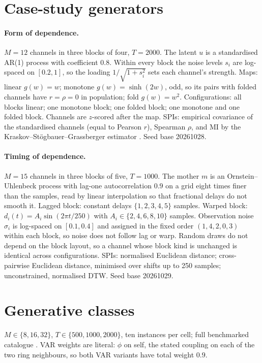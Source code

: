 \section{Case-study generators}
\label{app:cases}

\paragraph{Form of dependence.} $M=12$ channels in three blocks of four, $T=2000$. The latent $u$ is a standardised AR(1) process with coefficient $0.8$. Within every block the noise levels $s_i$ are log-spaced on $[0.2, 1]$, so the loading $1/\sqrt{1+s_i^2}$ sets each channel's strength. Maps: linear $g(w)=w$; monotone $g(w)=\sinh(2w)$, odd, so its pairs with folded channels have $r=\rho=0$ in population; fold $g(w)=w^2$. Configurations: all blocks linear; one monotone block; one folded block; one monotone and one folded block. Channels are $z$-scored after the map. SPIs: empirical covariance of the standardised channels (equal to Pearson $r$), Spearman $\rho$, and MI by the Kraskov--St\"ogbauer--Grassberger estimator . Seed base 20261028.

\paragraph{Timing of dependence.} $M=15$ channels in three blocks of five, $T=1000$. The mother $m$ is an Ornstein--Uhlenbeck process with lag-one autocorrelation $0.9$ on a grid eight times finer than the samples, read by linear interpolation so that fractional delays do not smooth it. Lagged block: constant delays $\{1,2,3,4,5\}$ samples. Warped block: $d_i(t) = A_i \sin(2\pi t/250)$ with $A_i \in \{2,4,6,8,10\}$ samples. Observation noise $\sigma_i$ is log-spaced on $[0.1, 0.4]$ and assigned in the fixed order $(1,4,2,0,3)$ within each block, so noise does not follow lag or warp. Random draws do not depend on the block layout, so a channel whose block kind is unchanged is identical across configurations. SPIs: normalised Euclidean distance; cross-pairwise Euclidean distance, minimised over shifts up to 250 samples; unconstrained, normalised DTW. Seed base 20261029.

\section{Generative classes}
\label{app:proof}
$M \in \{8,16,32\}$, $T \in \{500,1000,2000\}$, ten instances per cell; full benchmarked catalogue . VAR weights are literal: $\phi$ on self, the stated coupling on each of the two ring neighbours, so both VAR variants have total weight $0.9$.

